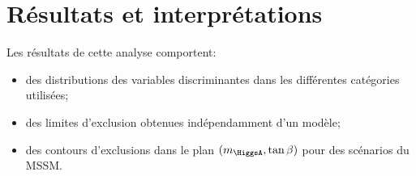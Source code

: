 \section{Résultats et interprétations}\label{chapter-HTT_analysis-section-results}
Les résultats de cette analyse comportent:
\begin{itemize}
\item des distributions des variables discriminantes dans les différentes catégories utilisées;
\item des limites d'exclusion obtenues indépendamment d'un modèle;
\item des contours d'exclusions dans le plan $(m_{\HiggsA},\tan\beta)$ pour des scénarios du MSSM.
\end{itemize}

%
%
%
